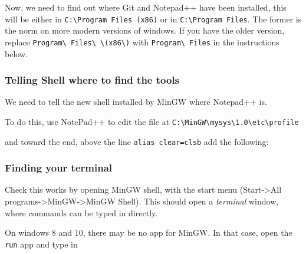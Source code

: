 Now, we need to find out where Git and Notepad++ have been installed,
this will be either in \texttt{C:\textbackslash{}Program Files (x86)} or
in \texttt{C:\textbackslash{}Program Files}. The former is the norm on
more modern versions of windows. If you have the older version, replace
\texttt{Program\textbackslash{} Files\textbackslash{} \textbackslash{}(x86\textbackslash{})}
with \texttt{Program\textbackslash{} Files} in the instructions below.

\subsubsection{Telling Shell where to find the
tools}\label{telling-shell-where-to-find-the-tools}

We need to tell the new shell installed by MinGW where Notepad++ is.

To do this, use NotePad++ to edit the file at
\texttt{C:\textbackslash{}MinGW\textbackslash{}mysys\textbackslash{}1.0\textbackslash{}etc\textbackslash{}profile}

and toward the end, above the line \texttt{alias clear=clsb} add the
following:

\begin{Shaded}
\begin{Highlighting}[]
 \DataTypeTok{\textbackslash{} }\DataTypeTok{\textbackslash{} \textbackslash{}(}\DataTypeTok{\textbackslash{})}
\end{Highlighting}
\end{Shaded}

\subsubsection{Finding your terminal}\label{finding-your-terminal}

Check this works by opening MinGW shell, with the start menu
(Start-\textgreater{}All
programs-\textgreater{}MinGW-\textgreater{}MinGW Shell). This should
open a \emph{terminal} window, where commands can be typed in directly.

On windows 8 and 10, there may be no app for MinGW. In that case, open
the \texttt{run} app and type in

\begin{Shaded}
\begin{Highlighting}[]
\end{Highlighting}
\end{Shaded}

